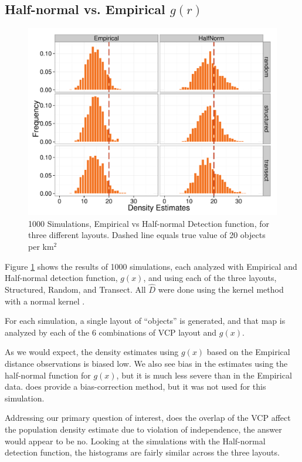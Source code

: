 \documentclass[12pt]{article}
\begin{document}
\subsection{Half-normal vs. Empirical $g(r)$}
\begin{figure}

	\includegraphics[width=\textwidth]{../images/Emp_Vs_Hnorm_1-2.pdf}
	\caption{1000 Simulations, Empirical vs Half-normal Detection function, for three different layouts. Dashed line equals true value of 20 objects per km$^2$\label{fig:sim1}}
		
\end{figure}
Figure \ref{fig:sim1} shows the results of 1000 simulations, each analyzed with Empirical and Half-normal detection function, $g(x)$, and using each of the three layouts, Structured, Random, and Transect. All $\hat{D}$  were done using the kernel method with a normal kernel \parencite{quang1993}.

For each simulation, a single layout of ``objects'' is generated, and that map is analyzed by each of the 6 combinations of VCP layout and $g(x)$. 

As we would expect, the density estimates using $g(x)$ based on the Empirical distance observations is biased low. We also see bias in the estimates using the half-normal function for $g(x)$, but it is much less severe than in the Empirical data. \textcite{quang1993} does provide a bias-correction method, but it was not used for this simulation.

Addressing our primary question of interest, does the overlap of the VCP affect the population density estimate due to violation of independence, the answer would appear to be no. Looking at the simulations with the Half-normal detection function, the histograms are fairly similar across the three layouts. 
\end{document}
